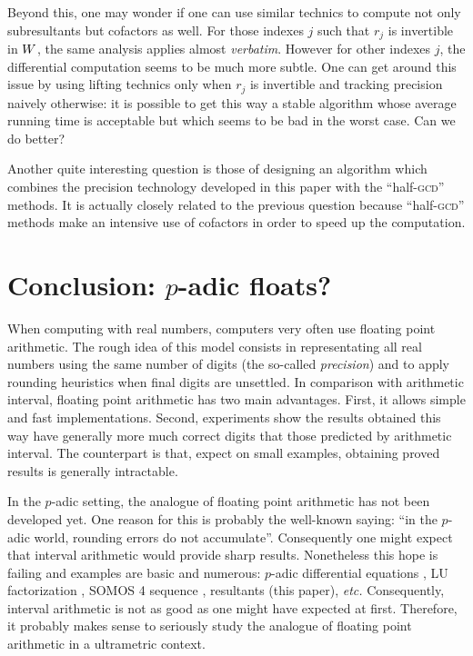 \documentclass{article}
\begin{document}
Beyond this, one may wonder if one can use similar technics to compute 
not only subresultants but cofactors as well. For those indexes $j$ such 
that $r_j$ is invertible in $W$, the same analysis applies almost 
\emph{verbatim}. However for other indexes $j$, the differential 
computation seems to be much more subtle. One can get around this issue 
by using lifting technics only when $r_j$ is invertible and tracking 
precision naively otherwise: it is possible to get this way a stable 
algorithm whose average running time is acceptable but which seems to be 
bad in the worst case. Can we do better?

Another quite interesting question is those of designing an algorithm 
which combines the precision technology developed in this paper with the 
``half-\textsc{gcd}'' methods. It is actually closely related to the 
previous question because ``half-\textsc{gcd}'' methods make an 
intensive use of cofactors in order to speed up the computation.

\section{Conclusion: $p$-adic floats?}

When computing with real numbers, computers very often use floating 
point arithmetic. 
The rough idea of this model consists in representating all real numbers 
using the same number of digits (the so-called \emph{precision}) and to
apply rounding heuristics when final digits are unsettled.
In comparison with arithmetic interval, floating point arithmetic has
two main advantages. First, it allows simple and fast implementations.
Second, experiments show the results obtained this way have generally
more much correct digits that those predicted by arithmetic interval.
The counterpart is that, expect on small examples, obtaining proved
results is generally intractable.

In the $p$-adic setting, the analogue of floating point arithmetic has 
not been developed yet. One reason for this is probably the well-known 
saying: ``in the $p$-adic world, rounding errors do not accumulate''. 
Consequently one might expect that interval arithmetic would provide 
sharp results. Nonetheless this hope is failing and examples are basic 
and numerous: $p$-adic differential equations \cite{bostan, padicdiff}, 
LU factorization \cite{LU}, SOMOS 4 sequence \cite{padicprec}, 
resultants (this paper), \emph{etc.} Consequently, interval arithmetic 
is not as good as one might have expected at first. Therefore, it 
probably makes sense to seriously study the analogue of floating point 
arithmetic in a ultrametric context.
\end{document}
